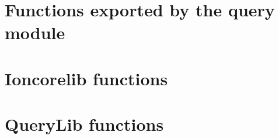 \documentclass[english,a4paper,11pt,oldtoc,mctitle]{rapport3}
\begin{document}


\section{Functions exported by the query module}
\label{sec:queryref}



\section{Ioncorelib functions}
\label{sec:ioncorelibref}



\section{QueryLib functions}
\label{sec:querylibref}



\appendix



\printindex
\end{document}
